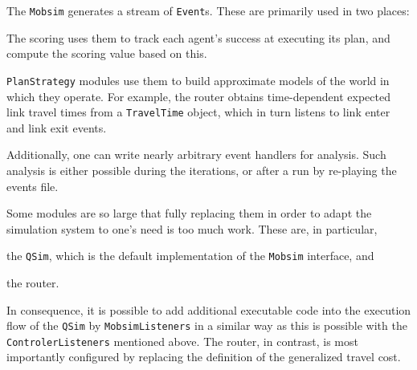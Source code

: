 The \lstinline|Mobsim| generates a stream of \lstinline|Event|s. These are primarily used in two places:
\begin{compactitem}
\item The scoring uses them to track each agent's success at executing its plan, and compute the scoring value based on this.
\item \lstinline|PlanStrategy| modules use them to build approximate models of the world in which they operate.  For example, the router obtains time-dependent expected link travel times from a \lstinline|TravelTime| object, which in turn listens to link enter and link exit events.
  
\end{compactitem}
Additionally, one can write nearly arbitrary event handlers for analysis.
Such analysis is either possible during the iterations, or after a run by re-playing the events file.

Some modules are so large that fully replacing them in order to adapt the simulation system to one's need is too much work. These are, in particular,
\begin{compactitem}
\item the \lstinline|QSim|, which is the default implementation of the \lstinline|Mobsim| interface, and
\item the router.
\end{compactitem}
In consequence, it is possible to add %
additional executable code
into the execution flow of the \lstinline|QSim| by \lstinline|MobsimListeners| in a similar way as this is possible with the \lstinline|ControlerListeners| mentioned above.
%
The router, in contrast, is most importantly configured by replacing the definition of the generalized travel cost. 

